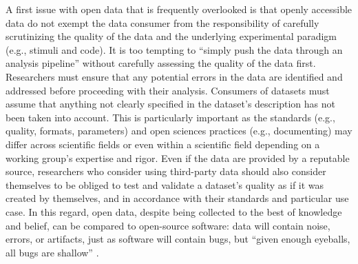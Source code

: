 A first issue with open data that is frequently overlooked is that openly
accessible data do not exempt the data consumer from the responsibility of
carefully scrutinizing the quality of the data and the underlying experimental
paradigm (e.g., stimuli and code).
%
It is too tempting to ``simply push the data through an analysis pipeline''
without carefully assessing the quality of the data first.
%
Researchers must ensure that any potential errors in the data are identified and
addressed before proceeding with their analysis.
Consumers of datasets must assume that anything not clearly specified in the
dataset's description has not been taken into account.
This is particularly important as the standards (e.g., quality, formats,
parameters) and open sciences practices (e.g., documenting) may differ across
scientific fields or even within a scientific field depending on a working
group's expertise and rigor.
Even if the data are provided by a reputable source, researchers who consider
using third-party data should also consider themselves to be obliged to test and
validate a dataset's quality as if it was created by themselves, and in
accordance with their standards and particular use case.
%
In this regard, open data, despite being collected to the best of knowledge and
belief, can be compared to open-source software:
data will contain noise, errors, or artifacts, just as software will contain
bugs, but ``given enough eyeballs, all bugs are shallow'' \citep[][p.
30]{raymond1999cathedral}.

